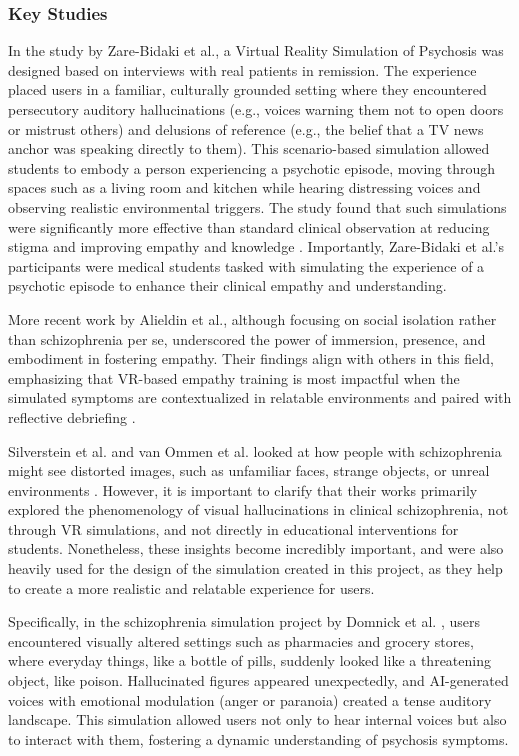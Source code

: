 \subsubsection{Key Studies}

In the study by Zare-Bidaki et al., a Virtual Reality Simulation of Psychosis was designed based on interviews with real patients in remission. The experience placed users in a familiar, culturally grounded setting where they encountered persecutory auditory hallucinations (e.g., voices warning them not to open doors or mistrust others) and delusions of reference (e.g., the belief that a TV news anchor was speaking directly to them). This scenario-based simulation allowed students to embody a person experiencing a psychotic episode, moving through spaces such as a living room and kitchen while hearing distressing voices and observing realistic environmental triggers. The study found that such simulations were significantly more effective than standard clinical observation at reducing stigma and improving empathy and knowledge \cite{Zare-Bidaki2022}. Importantly, Zare-Bidaki et al.'s participants were medical students tasked with simulating the experience of a psychotic episode to enhance their clinical empathy and understanding.

\vspace{1em}

More recent work by Alieldin et al., although focusing on social isolation rather than schizophrenia per se, underscored the power of immersion, presence, and embodiment in fostering empathy. Their findings align with others in this field, emphasizing that VR-based empathy training is most impactful when the simulated symptoms are contextualized in relatable environments and paired with reflective debriefing \cite{Alieldin2024}.

Silverstein et al. and van Ommen et al. looked at how people with schizophrenia might see distorted images, such as unfamiliar faces, strange objects, or unreal environments \cite{Silverstein2021,Vanommen2019}. However, it is important to clarify that their works primarily explored the phenomenology of visual hallucinations in clinical schizophrenia, not through VR simulations, and not directly in educational interventions for students. Nonetheless, these insights become incredibly important, and were also heavily used for the design of the simulation created in this project, as they help to create a more realistic and relatable experience for users.

Specifically, in the schizophrenia simulation project by Domnick et al. \cite{Domnick2023}, users encountered visually altered settings such as pharmacies and grocery stores, where everyday things, like a bottle of pills, suddenly looked like a threatening object, like poison. Hallucinated figures appeared unexpectedly, and AI-generated voices with emotional modulation (anger or paranoia) created a tense auditory landscape. This simulation allowed users not only to hear internal voices but also to interact with them, fostering a dynamic understanding of psychosis symptoms.

